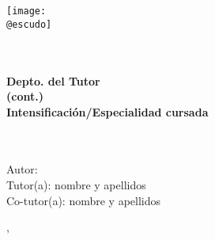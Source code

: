 \begin{titlepage}
    \makeatletter
	\begin{center}
        \vspace{1cm}
		\texttt{[image: \\@escudo]}\vspace{1cm}
		
		{\LARGE \textbf{\@instEdu \\[0.5ex]
				\@centroEdu}}\\[0.5cm]
		{\Large \textbf{Depto. del Tutor}}\\ \smallskip%
        {\Large\textbf{(cont.)}}\\[0.5cm]
		{\large \textbf{Intensificación/Especialidad cursada}}\\[1.5cm]
		{\LARGE \textbf{\@tipoDoc}}\\[1cm]
		
		
		{\LARGE \textbf{\@tituloPrimera}}\\ \smallskip%
		\ifdefined\@tituloSegunda{\LARGE \textbf{\@tituloSegunda}}
		\else \phantom{\LARGE Texto fantasma}
		\fi
	\end{center}
	\vfill%
	\begin{flushleft}
		{\Large Autor: \@autor} \\ \bigskip%
		{\Large Tutor(a): nombre y apellidos} \\ \bigskip%
		{\Large Co-tutor(a): nombre y apellidos}
	\end{flushleft}
	\vspace{2cm}%
	\begin{flushright}
		{\Large \ifspanish \@mesTF \else \@monthTF \fi, \@yearTF}
	\end{flushright}
	\cleardoublepage
    \makeatother
\end{titlepage}
	









